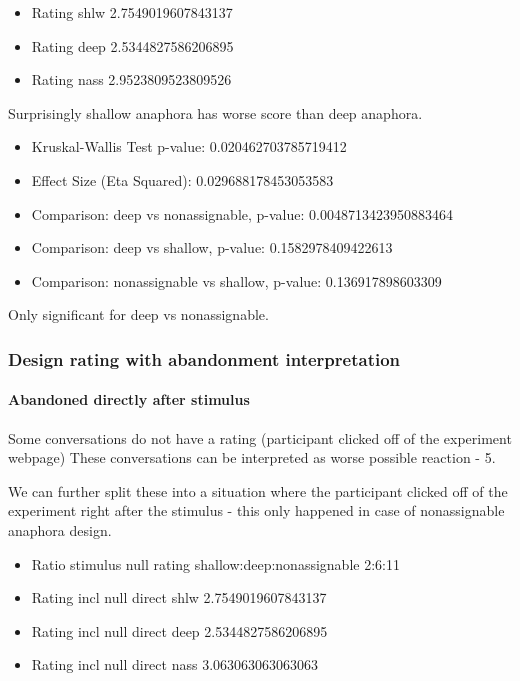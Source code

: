 \begin{itemize}
\item Rating shlw 2.7549019607843137
\item Rating deep 2.5344827586206895
\item Rating nass 2.9523809523809526
\end{itemize}

Surprisingly shallow anaphora has worse score than deep anaphora.

\begin{itemize}
\item Kruskal-Wallis Test p-value: 0.020462703785719412
\item Effect Size (Eta Squared): 0.029688178453053583
\item Comparison: deep vs nonassignable, p-value: 0.0048713423950883464
\item Comparison: deep vs shallow, p-value: 0.1582978409422613
\item Comparison: nonassignable vs shallow, p-value: 0.136917898603309
\end{itemize}

Only significant for deep vs nonassignable.

\subsubsection{Design rating with abandonment interpretation}

\paragraph{Abandoned directly after stimulus}

Some conversations do not have a rating (participant clicked off of the experiment webpage)
These conversations can be interpreted as worse possible reaction - 5.

We can further split these into a situation where the participant clicked off of the experiment
right after the stimulus - this only happened in case of nonassignable anaphora design.

\begin{itemize}
\item Ratio stimulus null rating shallow:deep:nonassignable 2:6:11
\item Rating incl null direct shlw 2.7549019607843137
\item Rating incl null direct deep 2.5344827586206895
\item Rating incl null direct nass 3.063063063063063
\end{itemize}

